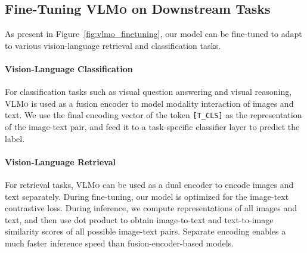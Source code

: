 \documentclass{article}
\newcommand{\sptk}[1]{\texttt{[#1]}}
\newcommand\our{\textsc{VLMo}}
\begin{document}
\subsection{Fine-Tuning \our{} on Downstream Tasks}
\label{sec:ft}

As present in Figure~\ref{fig:vlmo_finetuning}, our model can be fine-tuned to adapt to various vision-language retrieval and classification tasks. 

\paragraph{Vision-Language Classification}
For classification tasks such as visual question answering and visual reasoning, \our{} is used as a fusion encoder to model modality interaction of images and text.
We use the final encoding vector of the token \sptk{T\_CLS} as the representation of the image-text pair, and feed it to a task-specific classifier layer to predict the label.

\paragraph{Vision-Language Retrieval}
For retrieval tasks, \our{} can be used as a dual encoder to encode images and text separately.
During fine-tuning, our model is optimized for the image-text contrastive loss. 
During inference, we compute representations of all images and text, and then use dot product to obtain image-to-text and text-to-image similarity scores of all possible image-text pairs. 
Separate encoding enables a much faster inference speed than fusion-encoder-based models.
\end{document}

